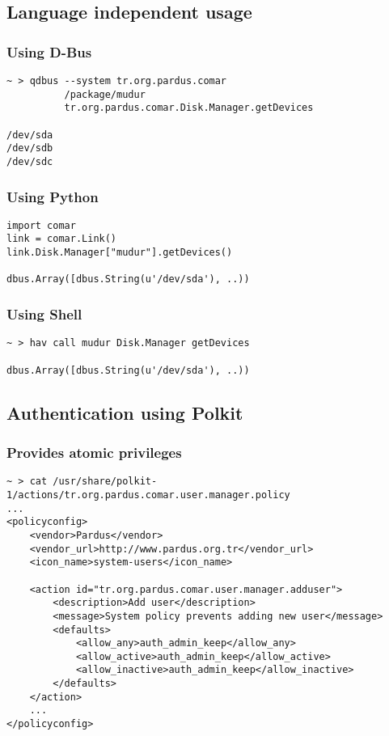 \documentclass{beamer}
\begin{document}
\subsection{Language independent usage}

\begin{frame}[fragile]
    \frametitle{Using D-Bus}
      \begin{verbatim}
~ > qdbus --system tr.org.pardus.comar 
          /package/mudur 
          tr.org.pardus.comar.Disk.Manager.getDevices

/dev/sda
/dev/sdb
/dev/sdc
      \end{verbatim}
\end{frame}

\begin{frame}[fragile]
    \frametitle{Using Python}
      \begin{verbatim}
import comar 
link = comar.Link()
link.Disk.Manager["mudur"].getDevices()

dbus.Array([dbus.String(u'/dev/sda'), ..))
      \end{verbatim}
\end{frame}
\begin{frame}[fragile]
    \frametitle{Using Shell}
      \begin{verbatim}
~ > hav call mudur Disk.Manager getDevices
 
dbus.Array([dbus.String(u'/dev/sda'), ..))
      \end{verbatim}
\end{frame}

\subsection{Authentication using Polkit}

\begin{frame}[fragile]
    \frametitle{Provides atomic privileges}
      \scriptsize
      \begin{verbatim}
~ > cat /usr/share/polkit-1/actions/tr.org.pardus.comar.user.manager.policy 
...
<policyconfig>
    <vendor>Pardus</vendor>
    <vendor_url>http://www.pardus.org.tr</vendor_url>
    <icon_name>system-users</icon_name>

    <action id="tr.org.pardus.comar.user.manager.adduser">
        <description>Add user</description>
        <message>System policy prevents adding new user</message>
        <defaults>
            <allow_any>auth_admin_keep</allow_any>
            <allow_active>auth_admin_keep</allow_active>
            <allow_inactive>auth_admin_keep</allow_inactive>
        </defaults>
    </action>
    ...
</policyconfig>
      \end{verbatim}
\end{frame}
\end{document}
